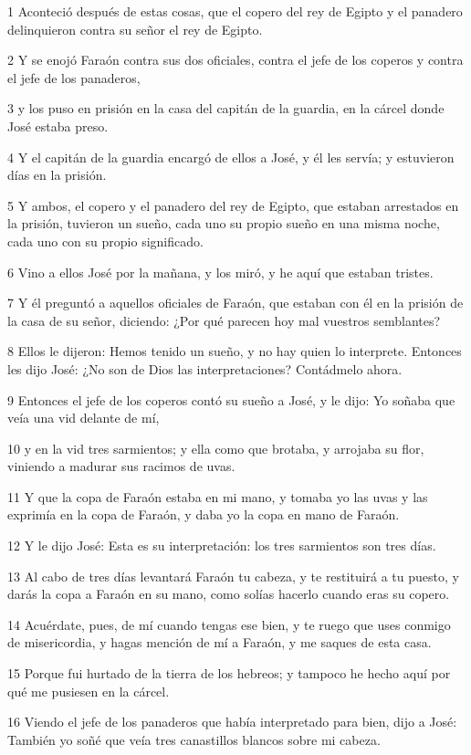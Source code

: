 1 Aconteció después de estas cosas, que el copero del rey de Egipto y el panadero delinquieron contra su señor el rey de Egipto.

2 Y se enojó Faraón contra sus dos oficiales, contra el jefe de los coperos y contra el jefe de los panaderos,

3 y los puso en prisión en la casa del capitán de la guardia, en la cárcel donde José estaba preso.

4 Y el capitán de la guardia encargó de ellos a José, y él les servía; y estuvieron días en la prisión.

5 Y ambos, el copero y el panadero del rey de Egipto, que estaban arrestados en la prisión, tuvieron un sueño, cada uno su propio sueño en una misma noche, cada uno con su propio significado.

6 Vino a ellos José por la mañana, y los miró, y he aquí que estaban tristes.

7 Y él preguntó a aquellos oficiales de Faraón, que estaban con él en la prisión de la casa de su señor, diciendo: ¿Por qué parecen hoy mal vuestros semblantes?

8 Ellos le dijeron: Hemos tenido un sueño, y no hay quien lo interprete. Entonces les dijo José: ¿No son de Dios las interpretaciones? Contádmelo ahora.

9 Entonces el jefe de los coperos contó su sueño a José, y le dijo: Yo soñaba que veía una vid delante de mí,

10 y en la vid tres sarmientos; y ella como que brotaba, y arrojaba su flor, viniendo a madurar sus racimos de uvas.

11 Y que la copa de Faraón estaba en mi mano, y tomaba yo las uvas y las exprimía en la copa de Faraón, y daba yo la copa en mano de Faraón.

12 Y le dijo José: Esta es su interpretación: los tres sarmientos son tres días.

13 Al cabo de tres días levantará Faraón tu cabeza, y te restituirá a tu puesto, y darás la copa a Faraón en su mano, como solías hacerlo cuando eras su copero.

14 Acuérdate, pues, de mí cuando tengas ese bien, y te ruego que uses conmigo de misericordia, y hagas mención de mí a Faraón, y me saques de esta casa.

15 Porque fui hurtado de la tierra de los hebreos; y tampoco he hecho aquí por qué me pusiesen en la cárcel.

16 Viendo el jefe de los panaderos que había interpretado para bien, dijo a José: También yo soñé que veía tres canastillos blancos sobre mi cabeza.

